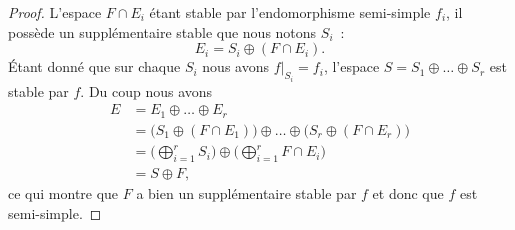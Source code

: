 \begin{proof}
    L'espace \( F\cap E_i\) étant stable par l'endomorphisme semi-simple \( f_i\), il possède un supplémentaire stable que nous notons \( S_i\)~:
    \begin{equation}
        E_i=S_i\oplus(F\cap E_i).
    \end{equation}
    Étant donné que sur chaque \( S_i\) nous avons \( f|_{S_i}=f_i\), l'espace \( S=S_1\oplus\ldots\oplus S_r\) est stable par \( f\). Du coup nous avons
    \begin{subequations}
        \begin{align}
            E&=E_1\oplus\ldots\oplus E_r\\
            &=\big( S_1\oplus(F\cap E_1) \big)\oplus\ldots\oplus\big( S_r\oplus(F\cap E_r) \big)\\
            &=\big( \bigoplus_{i=1}^rS_i \big)\oplus\big( \bigoplus_{i=1}^rF\cap E_i \big)\\
            &=S\oplus F,
        \end{align}
    \end{subequations}
    ce qui montre que \( F\) a bien un supplémentaire stable par \( f\) et donc que \( f\) est semi-simple.
\end{proof}

